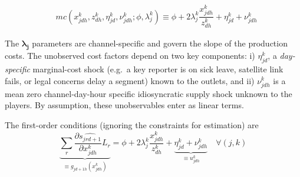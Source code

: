 \documentclass[12pt]{article}
\begin{document}
\begin{equation*}\label{}
	\begin{aligned}
		& mc(x_{jdh}^k,z_{dh}^k,\eta_{jd}^k,\nu_{jdh}^k; \phi,\lambda_j^k )\equiv   \phi +   2\lambda_j^k  \dfrac{x_{jdh}^k}{z_{dh}^k} + \eta_{jd}^k + \nu_{jdh}^k
	\end{aligned}
	\end{equation*} 




 The $\bm{\lambda_j}$ parameters are channel-specific and govern the slope of the production costs. The unobserved cost factors depend on two key components: i)
 $\eta_{jd}^k$, a \emph{ day-specific} marginal-cost shock
 (e.g.\ a key reporter is on sick leave, satellite link fails, or legal concerns delay a segment) known to the outlets,
 and ii) $\nu_{jdh}^k$ is a mean zero channel-day-hour specific idiosyncratic supply shock unknown to the players. By assumption, these unobservables enter as linear terms. 
 
 
 

 
 
 
 


The first-order conditions (ignoring the  constraints for estimation) are
\begin{equation}\label{eq:focs}
	\underbrace{\sum_{r}\frac{\partial \widehat{s_{jrd+1}}}{\partial x_{jdh}^k}L_r}_{\equiv g_{jd+1h}(x_{jdh}^k)}
	= \phi + 2\lambda_j^k\frac{x_{jdh}^k}{z_{dh}^k}  
	+ \underbrace{\eta_{jd}^k+\nu_{jdh}^k}_{\equiv u_{jdh}^k}
	\quad \forall(j,k)
\end{equation}
\end{document}
